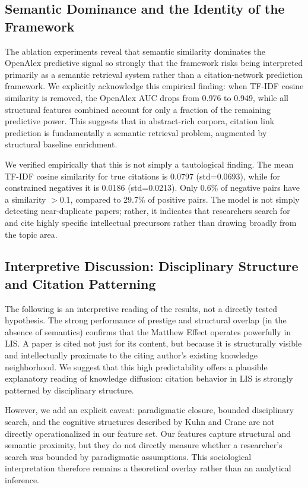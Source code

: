 \documentclass[11pt,a4paper]{article}
\begin{document}
\subsection{Semantic Dominance and the Identity of the Framework}
The ablation experiments reveal that semantic similarity dominates the OpenAlex predictive signal so strongly that the framework risks being interpreted primarily as a semantic retrieval system rather than a citation-network prediction framework. We explicitly acknowledge this empirical finding: when TF-IDF cosine similarity is removed, the OpenAlex AUC drops from 0.976 to 0.949, while all structural features combined account for only a fraction of the remaining predictive power. This suggests that in abstract-rich corpora, citation link prediction is fundamentally a semantic retrieval problem, augmented by structural baseline enrichment.

We verified empirically that this is not simply a tautological finding. The mean TF-IDF cosine similarity for true citations is 0.0797 (std=0.0693), while for constrained negatives it is 0.0186 (std=0.0213). Only 0.6\% of negative pairs have a similarity $>0.1$, compared to 29.7\% of positive pairs. The model is not simply detecting near-duplicate papers; rather, it indicates that researchers search for and cite highly specific intellectual precursors rather than drawing broadly from the topic area.

\subsection{Interpretive Discussion: Disciplinary Structure and Citation Patterning}
The following is an interpretive reading of the results, not a directly tested hypothesis. The strong performance of prestige and structural overlap (in the absence of semantics) confirms that the Matthew Effect operates powerfully in LIS. A paper is cited not just for its content, but because it is structurally visible and intellectually proximate to the citing author's existing knowledge neighborhood. We suggest that this high predictability offers a plausible explanatory reading of knowledge diffusion: citation behavior in LIS is strongly patterned by disciplinary structure. 

However, we add an explicit caveat: paradigmatic closure, bounded disciplinary search, and the cognitive structures described by Kuhn \citep{kuhn1962structure} and Crane \citep{crane1972invisible} are not directly operationalized in our feature set. Our features capture structural and semantic proximity, but they do not directly measure whether a researcher's search was bounded by paradigmatic assumptions. This sociological interpretation therefore remains a theoretical overlay rather than an analytical inference.
\end{document}
